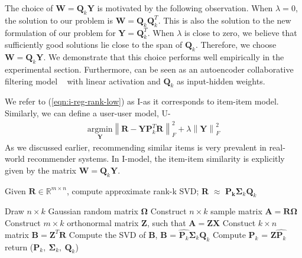 \documentclass{article}
\newcommand{\R}{\mathbf{R}}
\renewcommand{\P}{\mathbf{P}}
\newcommand{\Q}{\mathbf{Q}}
\newcommand{\W}{\mathbf{W}}
\newcommand{\Y}{\mathbf{Y}}
\begin{document}
The choice of $\W = \Q_k \Y$ is motivated by the following observation. When $\lambda = 0$, the solution to our problem is $\W = \Q_k \Q_k^T$. This is also the solution to the new formulation of our problem for $\Y = \Q_k^T$. When $\lambda$ is close to zero, we believe that sufficiently good solutions lie close to the span of $\Q_k$. Therefore, we choose $\W = \Q_k \Y$. We demonstrate that this choice performs well empirically in the experimental section. Furthermore, \LinearLow can be seen as an autoencoder collaborative filtering model ~\cite{Sedhain:2015} with linear activation and $\Q_k$ as input-hidden weights.

We refer to (\ref{eqn:i-reg-rank-low}) as I-\LinearLow as it corresponds to item-item model. Similarly, we can define a user-user model, U-\LinearLow
\begin{align}
\label{eqn:u-reg-rank-low}
\underset{\Y}{\mathrm{argmin}}  \left \| \R - \Y\P_k^T\R\right \|_F^2 + \lambda \left \|  \Y \right \|_F^2
\end{align}
As we discussed earlier, recommending similar items is very prevalent in real-world recommender systems.
In I-\LinearLow model, the item-item similarity is explicitly given by the matrix $\W = \Q_k \Y $.


\begin{algorithm}
        \small
        \caption{Given $\textbf{R} \in \mathbb{R}^{m \times n}$, compute approximate rank-k SVD; \textbf{R} $\approx$ $\textbf{P}_\textbf{k} \mathbf{\Sigma}_k \textbf{Q}_k$}
        \label{algo:RSVD}
        \begin{algorithmic}[1]

        \State Draw $n\times k$ Gaussian random matrix $\mathbf{\Omega}$
        \State Construct $n\times k$ sample matrix $\mathbf{A} = \mathbf{R}\mathbf{\Omega}$
        \State Construct $m\times k$ orthonormal matrix $\mathbf{Z}$, such that $\mathbf{A}  = \mathbf{Z}\mathbf{X}$
        \State Constuct $k\times n$ matrix $\mathbf{B} = \mathbf{Z}^T\mathbf{R}$
        \State Compute the SVD of $\mathbf{B}$, $\mathbf{B}$ =  $\hat{\mathbf{P}_k} \mathbf{\Sigma}_k \mathbf{Q}_k$
        \State Compute $\mathbf{P}_k$ =  $ \mathbf{Z} \hat{\mathbf{P}_k}$
        \State return ($\mathbf{P}_k,\ \mathbf{\Sigma}_k,\ \mathbf{Q}_k$)
        \EndProcedure
        \end{algorithmic}
\end{algorithm}
\end{document}
